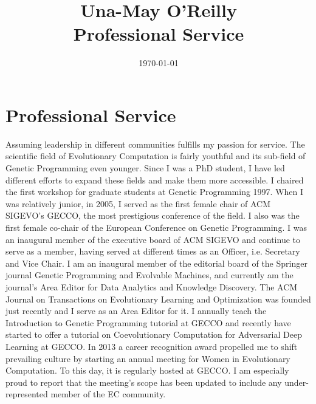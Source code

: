 \documentclass[12pt,bibliography=numbered]{article}
\begin{document}
\title{Una-May O'Reilly\\Professional Service
}
\author{  }

\date{\today}

\maketitle

\section*{Professional Service}

Assuming leadership in different communities fulfills my passion for service.  The scientific field of Evolutionary Computation is fairly youthful and its sub-field of Genetic Programming even younger. Since I was a PhD student, I have led different efforts to expand these fields and make them more accessible. I chaired the first workshop for graduate students at Genetic Programming 1997. When I was relatively junior, in 2005, I served as the first female chair of ACM SIGEVO's GECCO, the most prestigious conference of the field. I also was the first female co-chair of the European Conference on Genetic Programming. I was an inaugural member of the executive board of ACM SIGEVO and continue to serve as a member, having served at different times as an Officer, i.e. Secretary and Vice Chair. I am an inaugural member of the editorial board of the Springer journal Genetic Programming and Evolvable Machines, and currently am the journal's Area Editor for Data Analytics and Knowledge Discovery.  The ACM Journal on Transactions on Evolutionary Learning and Optimization was founded just recently and I serve as an Area Editor for it. 
I annually teach the Introduction to Genetic Programming tutorial at GECCO and recently have started to offer a tutorial on Coevolutionary Computation for Adversarial Deep Learning at GECCO.  In 2013 a career recognition award propelled me to shift prevailing culture by starting an annual meeting for Women in Evolutionary Computation. To this day, it is  regularly hosted at  GECCO.  I am especially proud to report that the meeting's scope has been updated to include any under-represented member of the EC community.   
\end{document}
